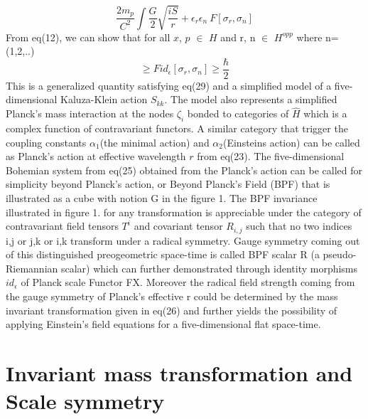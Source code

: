 \documentclass{article}
\begin{document}
\begin{equation}
   \frac{2 m_p}{C^2} \int \frac{G}{2}\sqrt{\frac{iS}{r}} + \epsilon_r \epsilon_n \ F [\sigma_r ,\sigma_n] 
\end{equation} From eq(12), we can show that for all $x$, $p$ $\in$ $H$ and r, n $\in$ $H^{opp}$ where n= (1,2,..) 
\begin{equation}
     [\delta (x), \delta (p)] \geq Fid_{\epsilon} [\sigma_r, \sigma_n] \geq \frac{\hbar}{2}
\end{equation} This is a generalized quantity satisfying eq(29) and a simplified model of a five-dimensional Kaluza-Klein action $S_{kk}$. The model also represents a simplified Planck's mass interaction at the nodes $\zeta_{i}$ bonded to categories of $\hat H$ which is a complex function of contravariant functors. A similar category that trigger the coupling constants $\alpha_1$(the minimal action) and $\alpha_2$(Einsteins action) can be called as Planck's action at effective wavelength $r$ from eq(23). The five-dimensional Bohemian system from eq(25) obtained from the Planck's action can be called for simplicity beyond Planck's action, or Beyond Planck's Field (BPF) that is illustrated as a cube with notion G in the figure 1. The BPF invariance illustrated in figure 1. for any transformation is appreciable under the category of contravariant field tensors $T^i$ and covariant tensor $R_{i,j}$  such that no two indices i,j or j,k or i,k transform under a radical symmetry. Gauge symmetry coming out of this distinguished preogeometric space-time is called BPF scalar R (a pseudo-Riemannian scalar) which can further demonstrated through identity morphisms $id_\epsilon$ of Planck scale Functor FX. Moreover the radical field strength coming from the gauge symmetry of Planck's effective r could be determined by the mass invariant transformation  given in eq(26) and further yields the possibility of applying Einstein’s field equations for a five-dimensional flat space-time.   
\section{Invariant mass transformation and Scale symmetry} 
\end{document}

